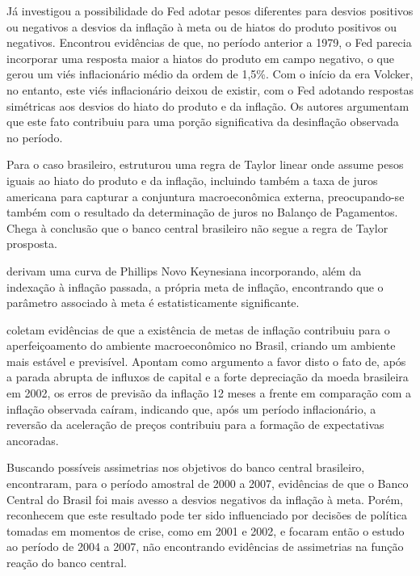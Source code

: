 \documentclass[
	article,			%
	11pt,				%
	oneside,			%
	a4paper,			%
	english,			%
	brazil,				%
	]{abntex2}
\begin{document}
	Já  investigou a possibilidade do Fed adotar pesos diferentes para desvios positivos ou negativos a desvios da inflação à meta ou de hiatos do produto positivos ou negativos. Encontrou evidências de que, no período anterior a 1979, o Fed parecia incorporar uma resposta maior a hiatos do produto em campo negativo, o que gerou um viés inflacionário médio da ordem de 1,5\%. Com o início da era Volcker, no entanto, este viés inflacionário deixou de existir, com o Fed adotando respostas simétricas aos desvios do hiato do produto e da inflação. Os autores argumentam que este fato contribuiu para uma porção significativa da desinflação observada no período.
	
	Para o caso brasileiro,  estruturou uma regra de Taylor linear onde assume pesos iguais ao hiato do produto e da inflação, incluindo também a taxa de juros americana para capturar a conjuntura macroeconômica externa, preocupando-se também com o resultado da determinação de juros no Balanço de Pagamentos. Chega à conclusão que o banco central brasileiro não segue a regra de Taylor prosposta.
	
	 derivam uma curva de Phillips Novo Keynesiana incorporando, além da indexação à inflação passada, a própria meta de inflação, encontrando que o parâmetro associado à meta é estatisticamente significante.
	
	 coletam evidências de que a existência de metas de inflação contribuiu para o aperfeiçoamento do ambiente macroeconômico no Brasil, criando um ambiente mais estável e previsível. Apontam como argumento a favor disto o fato de, após a parada abrupta de influxos de capital e a forte depreciação da moeda brasileira em 2002, os erros de previsão da inflação 12 meses a frente em comparação com a inflação observada caíram, indicando que, após um período inflacionário, a reversão da aceleração de preços contribuiu para a formação de expectativas ancoradas.
	
	Buscando possíveis assimetrias nos objetivos do banco central brasileiro,  encontraram, para o período amostral de 2000 a 2007, evidências de que o Banco Central do Brasil foi mais avesso a desvios negativos da inflação à meta. Porém, reconhecem que este resultado pode ter sido influenciado por decisões de política tomadas em momentos de crise, como em 2001 e 2002, e focaram então o estudo ao período de 2004 a 2007, não encontrando evidências de assimetrias na função reação do banco central.
	
\end{document}
